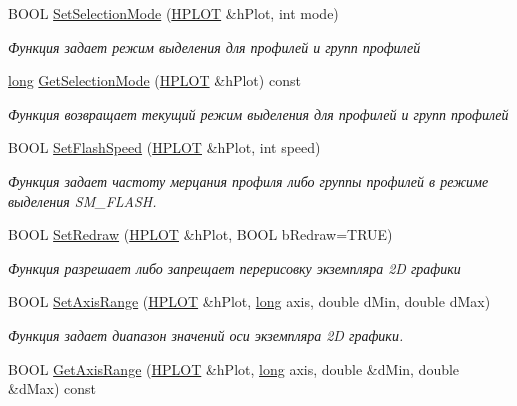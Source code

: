 \begin{DoxyCompactItemize}
B\-O\-O\-L \hyperlink{group__gr_select_gadcf35c2c2d175cd20d607a05b069fa42}{Set\-Selection\-Mode} (\hyperlink{classxyplot_1_1_h_p_l_o_t}{H\-P\-L\-O\-T} \&h\-Plot, int mode)
\begin{DoxyCompactList}\small\item\em Функция задает режим выделения для профилей и групп профилей \end{DoxyCompactList}\item 
\hyperlink{namespacexyplot_a27bc71b0bdfac09495e7e531d8a918c5}{long} \hyperlink{group__gr_select_ga0e7cc28041a0ca7df37af0a4ebd126a4}{Get\-Selection\-Mode} (\hyperlink{classxyplot_1_1_h_p_l_o_t}{H\-P\-L\-O\-T} \&h\-Plot) const 
\begin{DoxyCompactList}\small\item\em Функция возвращает текущий режим выделения для профилей и групп профилей \end{DoxyCompactList}\item 
B\-O\-O\-L \hyperlink{group__gr_select_gae329866f17329d4f26be83d566cdeecd}{Set\-Flash\-Speed} (\hyperlink{classxyplot_1_1_h_p_l_o_t}{H\-P\-L\-O\-T} \&h\-Plot, int speed)
\begin{DoxyCompactList}\small\item\em Функция задает частоту мерцания профиля либо группы профилей в режиме выделения S\-M\-\_\-\-F\-L\-A\-S\-H. \end{DoxyCompactList}\item 
B\-O\-O\-L \hyperlink{classxyplot_1_1_x_y_plot_manager_ab7231a3949a367bc02164dc0705e4fa0}{Set\-Redraw} (\hyperlink{classxyplot_1_1_h_p_l_o_t}{H\-P\-L\-O\-T} \&h\-Plot, B\-O\-O\-L b\-Redraw=T\-R\-U\-E)
\begin{DoxyCompactList}\small\item\em Функция разрешает либо запрещает перерисовку экземпляра 2\-D графики \end{DoxyCompactList}\item 
B\-O\-O\-L \hyperlink{group__gr_elements_gac086b543fc9cab773b6807c2420ce739}{Set\-Axis\-Range} (\hyperlink{classxyplot_1_1_h_p_l_o_t}{H\-P\-L\-O\-T} \&h\-Plot, \hyperlink{namespacexyplot_a27bc71b0bdfac09495e7e531d8a918c5}{long} axis, double d\-Min, double d\-Max)
\begin{DoxyCompactList}\small\item\em Функция задает диапазон значений оси экземпляра 2\-D графики. \end{DoxyCompactList}\item 
B\-O\-O\-L \hyperlink{group__gr_elements_ga086a2c52f7ad3bddbe9269228fd0977a}{Get\-Axis\-Range} (\hyperlink{classxyplot_1_1_h_p_l_o_t}{H\-P\-L\-O\-T} \&h\-Plot, \hyperlink{namespacexyplot_a27bc71b0bdfac09495e7e531d8a918c5}{long} axis, double \&d\-Min, double \&d\-Max) const 

\end{DoxyCompactItemize}
